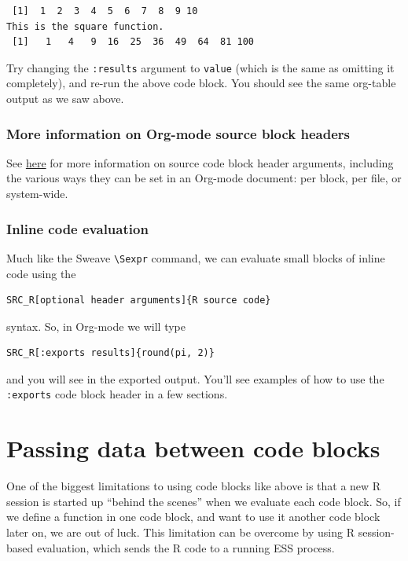 \documentclass[11pt]{article}
\begin{document}
\begin{verbatim}
 [1]  1  2  3  4  5  6  7  8  9 10
This is the square function.
 [1]   1   4   9  16  25  36  49  64  81 100
\end{verbatim}

Try changing the \texttt{:results} argument to \texttt{value} (which is the same as
omitting it completely), and re-run the above code block. You should
see the same org-table output as we saw above.
\subsubsection*{More information on Org-mode source block headers}
\label{sec-3-2-3}

See \href{http://orgmode.org/manual/Header-arguments.html#Header-arguments}{here} for more information on source code block header arguments,
including the various ways they can be set in an Org-mode document:
per block, per file, or system-wide.
\subsubsection*{Inline code evaluation}
\label{sec-3-2-4}
Much like the Sweave \texttt{\textbackslash{}Sexpr} command, we can evaluate small blocks of inline code using the

\begin{verbatim}
SRC_R[optional header arguments]{R source code}
\end{verbatim}

syntax.  So, in Org-mode we will type

\begin{verbatim}
SRC_R[:exports results]{round(pi, 2)}
\end{verbatim}

and you will see in the exported
output.  You'll see examples of how to use the \texttt{:exports} code block
header in a few sections.
\section*{Passing data between code blocks}
\label{sec-4}

One of the biggest limitations to using code blocks like above is that
a new R session is started up ``behind the scenes'' when we evaluate
each code block. So, if we define a function in one code block, and
want to use it another code block later on, we are out of luck. This
limitation can be overcome by using R session-based evaluation, which
sends the R code to a running ESS process.
\end{document}
